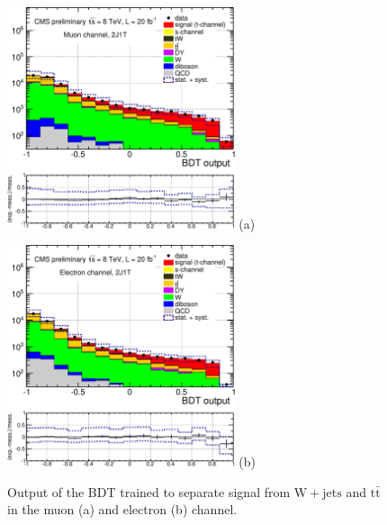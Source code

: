 \documentclass[a4paper]{jpconf}
\newcommand{\wjets}[0]{\mathrm{W+jets}}
\newcommand{\ttbar}[0]{\ensuremath{\mathrm{t\bar{t}}}}
\begin{document}
\begin{figure}[h]
\begin{center}
\begin{minipage}{7cm}
\includegraphics[height=6.5cm]{mva_bdt_mu-crop}
\center (a)
\end{minipage}\hspace{1cm}%
\begin{minipage}{7cm}
\includegraphics[height=6.5cm]{mva_bdt_el-crop}
\center (b)
\end{minipage} 
\caption{Output of the BDT trained to separate signal from $\wjets$ and $\ttbar$ in the muon (a) and electron (b) channel.}
\end{center}
\end{figure}
\end{document}
